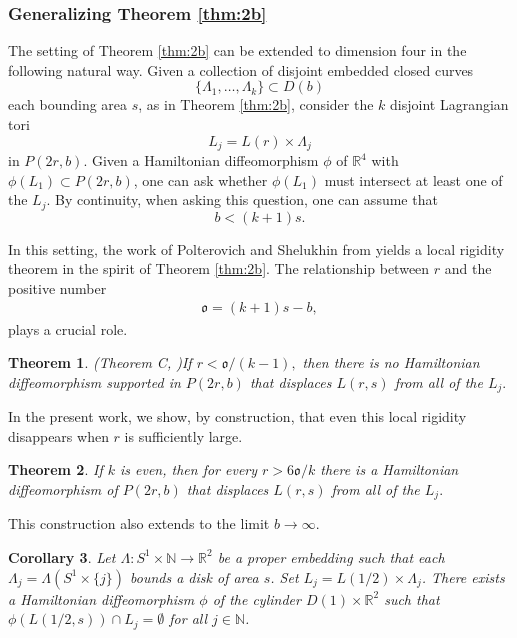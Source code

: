 \documentclass[12pt]{amsart}
\newtheorem{theorem}{Theorem}[section]
\newtheorem{corollary}[theorem]{Corollary}
\theoremstyle{definition}
\newcommand{\RR}{{\mathbb R}}
\newcommand{\NN}{{\mathbb N}}
\begin{document}
\bigskip


\subsubsection{Generalizing Theorem \ref{thm:2b}} The setting of Theorem \ref{thm:2b} can be extended to dimension four in the following natural way. Given a collection of disjoint embedded closed curves  
$$\{\Lambda_1, \dots, \Lambda_{k}\} \subset D(b)$$
each bounding area $s$, as in Theorem \ref{thm:2b}, consider the $k$ disjoint Lagrangian tori
$$L_j = L(r) \times \Lambda_j$$ in $P(2r,b).$ Given a Hamiltonian diffeomorphism $\phi$ of $\RR^4$ with $\phi(L_1) \subset P(2r,b)$, one can ask whether $\phi(L_1)$ must intersect at least one of the $L_j$. 
By continuity, when asking this question, one can assume that  $$b < (k+1)s.$$ 


In this setting, the work of Polterovich and Shelukhin from \cite{ps} yields a local rigidity theorem in the spirit of Theorem \ref{thm:2b}. The relationship between $r$ and the positive number
 \begin{align}\label{eq:g}
    \mathfrak{o} = (k+1)s-b,
\end{align}
plays a crucial role.
\begin{theorem}(Theorem C, \cite{ps})\label{thm:ps}
If $r < \mathfrak{o}/(k-1),$ then there is no Hamiltonian diffeomorphism supported in $P(2r,b)$ that displaces $L(r,s)$ from all of the $L_j.$
\end{theorem}

In the present work, we show, by construction, that even this local rigidity disappears when $r$ is sufficiently large.

\begin{theorem}\label{thm:hm}
If $k$ is even, then for every $r> 6\mathfrak{o}/k $ there is a Hamiltonian diffeomorphism of $P(2r,b)$ that displaces $L(r,s)$ from all of the  $L_j.$
\end{theorem}

This construction also extends to the limit $b \to \infty$.

\begin{corollary}\label{cor:disc}
    Let $\Lambda \colon S^1 \times \NN \to \RR^2$ be a proper embedding such that each $\Lambda_j = \Lambda(S^1 \times \{j\})$ bounds a disk of area $s$. Set $L_j = L(1/2) \times \Lambda_j$. There exists a Hamiltonian diffeomorphism $\phi$ of the cylinder  $D(1) \times \RR^2 $ such that $\phi(L(1/2,s)) \cap L_j=\emptyset$ for all $j \in \NN$.
\end{corollary}
\end{document}
